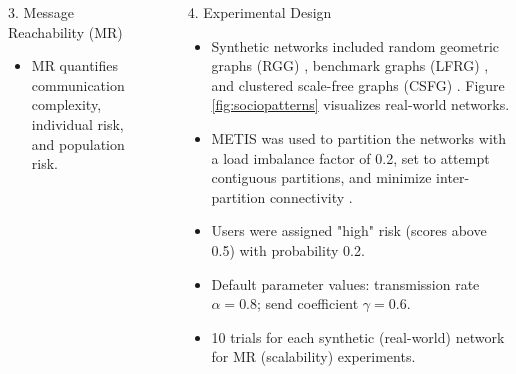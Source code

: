\documentclass[final]{beamer}
\newlength{\sepwidth}
\newlength{\colwidth}
\newcommand{\separatorcolumn}{\begin{column}{\sepwidth}\end{column}}
\newcommand{\vTransmissionRate}{\alpha}
\newcommand{\vSendCoefficient}{\gamma}
\newcommand{\vVariables}{V}
\newcommand{\vReachability}{m}
\newcommand{\vEstimatedReachability}{\hat{\vReachability}}
\begin{document}
\begin{frame}[t]
\begin{columns}[t]
\begin{column}{\colwidth}
\begin{block}{3. Message Reachability (MR)}
\begin{itemize}
\begin{equation}
                    \vEstimatedReachability(u) &= \max \{\vEstimatedReachability(u, v) \mid v \in \vVariables \}
            	\end{equation}
            \item MR quantifies communication complexity, individual risk, and population risk.
		\end{itemize}
	\end{block}
\end{column}
\separatorcolumn
\begin{column}{\colwidth}
	\begin{block}{4. Experimental Design}
		\begin{itemize}
			\item Synthetic networks included random geometric graphs (RGG) \cite{Dall2002}, benchmark graphs (LFRG) \cite{Lancichinetti2008}, and clustered scale-free graphs (CSFG) \cite{Holme2002}. Figure \ref{fig:sociopatterns} visualizes real-world networks.
			\item METIS was used to partition the networks with a load imbalance factor of 0.2, set to attempt contiguous partitions, and minimize inter-partition connectivity \cite{Karypis1998}.
			\item Users were assigned "high" risk (scores above 0.5) with probability 0.2.
			\item Default parameter values: transmission rate $\vTransmissionRate = 0.8$; send coefficient $\vSendCoefficient = 0.6$.
			\item 10 trials for each synthetic (real-world) network for MR (scalability) experiments.
		\end{itemize}
		\vspace{-1em}
	    \begin{figure}
	    	\centering
	    	 \qquad
			 \qquad

\end{figure}
\end{block}
\end{column}
\end{columns}
\end{frame}
\end{document}
